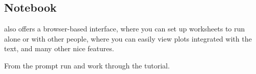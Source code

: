 \subsection{Notebook}
\Sage{} also offers a browser-based interface, where you can set up
worksheets to run alone or with other people, where you can easily
view plots integrated with the text, and many other nice features.

From the \Sage{} prompt run  and
work through the tutorial.
\endinput


TODO:
  1) how to use notebook to do exercises?